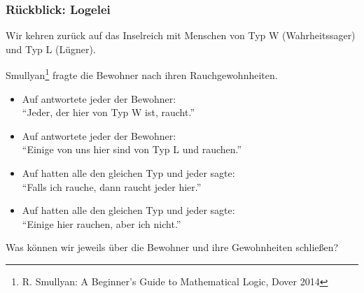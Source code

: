 \documentclass[aspectratio=1610,onlymath]{beamer}
\begin{document}
\maketitle

\begin{frame}\frametitle{Rückblick: Logelei}

Wir kehren zurück auf das Inselreich mit Menschen von
Typ W (Wahrheitssager) und Typ L (Lügner).
\bigskip

Smullyan\footnote{R. Smullyan: A Beginner's Guide to Mathematical Logic, Dover 2014} fragte die Bewohner nach ihren Rauchgewohnheiten.

\begin{itemize}
\item Auf  antwortete jeder der Bewohner:\\ \alert{"`Jeder, der hier von Typ W ist, raucht."'}\\
%
\item Auf  antwortete jeder der Bewohner:\\ \alert{"`Einige von uns hier sind von Typ L und rauchen."'}
%
\item Auf  hatten alle den gleichen Typ und jeder sagte:\\ \alert{"`Falls ich rauche, dann raucht jeder hier."'}
%
\item Auf  hatten alle den gleichen Typ und jeder sagte:\\ \alert{"`Einige hier rauchen, aber ich nicht."'}
\end{itemize}

Was können wir jeweils über die Bewohner und ihre Gewohnheiten schließen?

\end{frame}
\end{document}
